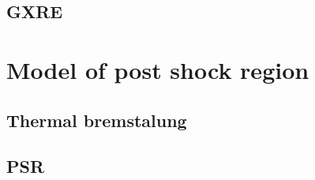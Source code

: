 \documentclass[oneside,a4paper,11pt]{report}
\begin{document}
\section{GXRE}



\chapter{Model of post shock region}
\section{Thermal bremstalung}




\section{PSR}



\end{document}
